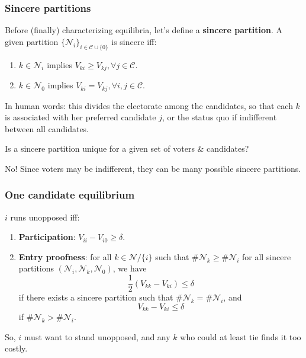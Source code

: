 \documentclass[11pt,aspectratio=169]{beamer}
\begin{document}
\begin{frame}
\frametitle{Sincere partitions}

Before (finally) characterizing equilibria, let's define a \textbf{sincere partition}. A given partition $\{ \mathcal{N}_i \}_{i\in \mathcal{C}\cup \{0\}}$ is sincere iff: 
\begin{enumerate}
\item $k\in \mathcal{N}_i$ implies $V_{ki}\geq V_{kj}, \forall j\in\mathcal{C}$. 
\item $k\in \mathcal{N}_0$ implies $V_{ki} = V_{kj}, \forall i,j\in\mathcal{C}$. 
\end{enumerate}

\bigskip

In human words: this divides the electorate among the candidates, so that each $k$ is associated with her preferred candidate $j$, or the status quo if indifferent between all candidates.

\bigskip

\pause

\begin{tcolorbox}
Is a sincere partition unique for a given set of voters \& candidates?
\end{tcolorbox}

\pause 

No! Since voters may be indifferent, they can be many possible sincere partitions.




\end{frame}



\begin{frame}
\frametitle{One candidate equilibrium}

$i$ runs unopposed iff: \begin{enumerate}
\item \textbf{Participation}: $V_{ii}-V_{i0} \geq \delta$.
\item \textbf{Entry proofness}: for all $k \in \mathcal{N}/\{i\}$ such that $\#\mathcal{N}_k \geq \#\mathcal{N}_i$ for all sincere partitions $(\mathcal{N}_i,\mathcal{N}_k,\mathcal{N}_0)$, we have \vspace{-8pt}$$\frac{1}{2}(V_{kk}-V_{ki}) \leq \delta$$ if there exists a sincere partition such that $\#\mathcal{N}_k = \#\mathcal{N}_i$, and $$V_{kk}-V_{ki}\leq \delta$$ if $\#\mathcal{N}_k > \#\mathcal{N}_i$.
\end{enumerate}

\bigskip

So, $i$ must want to stand unopposed, and any $k$ who could at least tie finds it too costly.

\end{frame}
\end{document}

